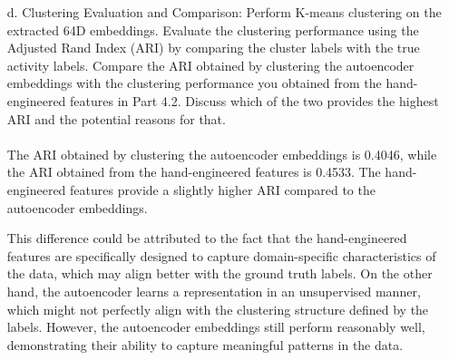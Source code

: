 \documentclass[a3paper,12pt]{extarticle} %
\begin{document}
\begin{enumerate}
\begin{itemize}
\item[d.] Clustering Evaluation and Comparison: Perform K-means clustering on the extracted 64D embeddings. Evaluate the clustering performance using the Adjusted Rand Index (ARI) by comparing the cluster labels with the true activity labels. Compare the ARI obtained by clustering the autoencoder embeddings with the clustering performance you obtained from the hand-engineered features in Part 4.2. Discuss which of the two provides the highest ARI and the potential reasons for that.
\\\\ The ARI obtained by clustering the autoencoder embeddings is 0.4046, while the ARI obtained from the hand-engineered features is 0.4533. The hand-engineered features provide a slightly higher ARI compared to the autoencoder embeddings. 

This difference could be attributed to the fact that the hand-engineered features are specifically designed to capture domain-specific characteristics of the data, which may align better with the ground truth labels. On the other hand, the autoencoder learns a representation in an unsupervised manner, which might not perfectly align with the clustering structure defined by the labels. However, the autoencoder embeddings still perform reasonably well, demonstrating their ability to capture meaningful patterns in the data.
\end{itemize}

\end{enumerate}
\end{document}
